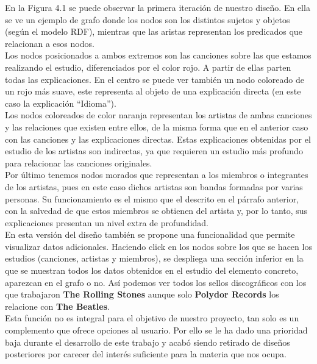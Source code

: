 En la Figura 4.1 se puede observar la primera iteración de nuestro diseño. En ella se ve un ejemplo de grafo donde los nodos son los distintos sujetos y objetos (según el modelo RDF), mientras que las aristas representan los predicados que relacionan a esos nodos.\\

Los nodos posicionados a ambos extremos son las canciones sobre las que estamos realizando el estudio, diferenciados por el color rojo. A partir de ellas parten todas las explicaciones. En el centro se puede ver también un nodo coloreado de un rojo más suave, este representa al objeto de una explicación directa (en este caso la explicación ``Idioma'').\\

Los nodos coloreados de color naranja representan los artistas de ambas canciones y las relaciones que existen entre ellos, de la misma forma que en el anterior caso con las canciones y las explicaciones directas. Estas explicaciones obtenidas por el estudio de los artistas son indirectas, ya que requieren un estudio más profundo para relacionar las canciones originales.\\

Por último tenemos nodos morados que representan a los miembros o integrantes de los artistas, pues en este caso dichos artistas son bandas formadas por varias personas. Su funcionamiento es el mismo que el descrito en el párrafo anterior, con la salvedad de que estos miembros se obtienen del artista y, por lo tanto, sus explicaciones presentan un nivel extra de profundidad.\\

En esta versión del diseño también se propone una funcionalidad que permite visualizar datos adicionales. Haciendo click en los nodos sobre los que se hacen los estudios (canciones, artistas y miembros), se despliega una sección inferior en la que se muestran todos los datos obtenidos en el estudio del elemento concreto, aparezcan en el grafo o no. Así podemos ver todos los sellos discográficos con los que trabajaron \textbf{The Rolling Stones} aunque solo \textbf{Polydor Records} los relacione con \textbf{The Beatles}.\\

Esta función no es integral para el objetivo de nuestro proyecto, tan solo es un complemento que ofrece opciones al usuario. Por ello se le ha dado una prioridad baja durante el desarrollo de este trabajo y acabó siendo retirado de diseños posteriores por carecer del interés suficiente para la materia que nos ocupa.\\
